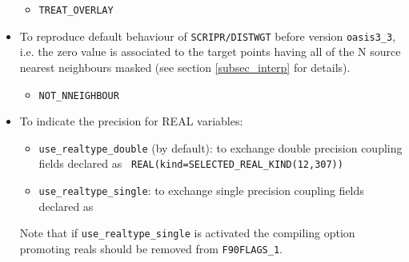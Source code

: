 \begin{itemize}
  \begin{itemize}
  \item {\tt TREAT\_OVERLAY}
  \end{itemize} 

\item To reproduce default behaviour of {\tt SCRIPR/DISTWGT} before
  version {\tt oasis3\_3}, i.e. the zero value is associated to the
  target points having all of the N source nearest neighbours masked
  (see section \ref{subsec_interp} for details).
  \begin{itemize}
  \item {\tt NOT\_NNEIGHBOUR}
  \end{itemize} 
  
\item To indicate the precision for REAL variables:

  \begin{itemize}
  \item {\tt use\_realtype\_double} (by default): to exchange double
    precision coupling fields declared as {\tt
      REAL(kind=SELECTED\_REAL\_KIND(12,307))}
  \item {\tt use\_realtype\_single}: to exchange single precision coupling
    fields declared as 
  \end{itemize}
  Note that if {\tt use\_realtype\_single} is activated the compiling
  option promoting reals should be removed from {\tt F90FLAGS\_1}.




\end{itemize}
